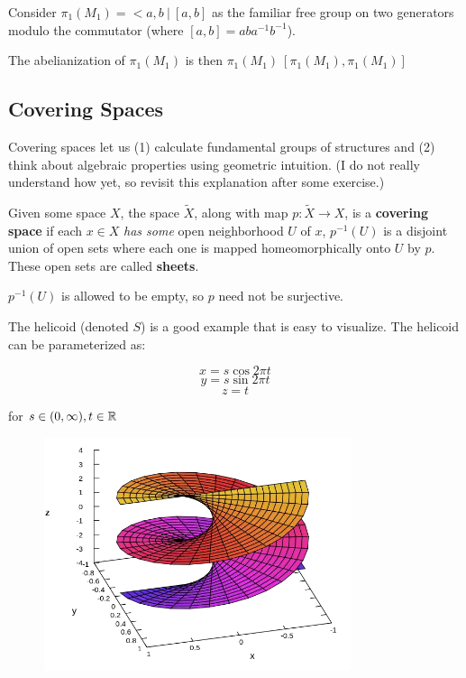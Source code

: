 \documentclass[10pt]{article}
\begin{document}
\begin{note}[Abelianization of $\pi_1(M_1)$]
	Consider $\pi_1(M_1) = < a, b ~|~ [a, b]$ as the familiar free group on two
	generators modulo the commutator (where $[a, b] = aba^{-1}b^{-1}$).

	The abelianization of $\pi_1(M_1)$ is then $\pi_1(M_1) \ [\pi_1(M_1), \pi_1(M_1)]$
\end{note}

\subsection{Covering Spaces}

Covering spaces let us (1) calculate fundamental groups of structures and (2)
think about algebraic properties using geometric intuition. (I do not really
understand how yet, so revisit this explanation after some exercise.)

\begin{definition}

	Given some space $X$, the space $\tilde{X}$, along with map $p: \tilde{X} \to
	X$, is a \textbf{covering space} if each $x \in X$ \textit{has some} open neighborhood
	$U$ of $x$, $p^{-1}(U)$ is a disjoint union of open sets where each one is
	mapped homeomorphically onto $U$ by $p$. These open sets are called
	\textbf{sheets}.
	
	$p^{-1}(U)$ is allowed to be empty, so $p$ need not be surjective.

\end{definition}

The helicoid (denoted $S$) is a good example that is easy to visualize. The helicoid can be
parameterized as: 

\[x = s \cos 2\pi t \]
\[y = s \sin 2\pi t \]
\[z = t \]

for $s \in (0, \infty), t \in \mathbb{R}$

\begin{figure}[ht!]
\centering
\includegraphics[width=90mm]{./helicoid.png}
\caption{}
\end{figure}
\end{document}
